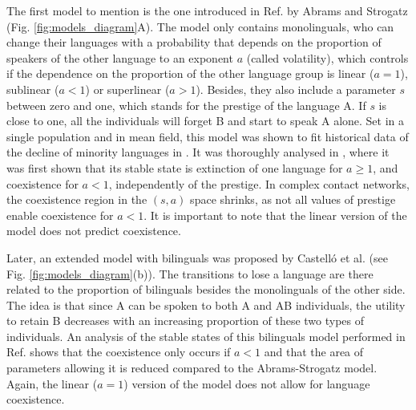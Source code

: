 \documentclass[../thesis.tex]{subfiles}
\begin{document}
The first model to mention is the one introduced in Ref.
\cite{AbramsModellingDynamics2003} by Abrams and Strogatz (Fig.
\ref{fig:models_diagram}A). The model only contains monolinguals, who can change their
languages with a probability that depends on the proportion of speakers of the other
language to an exponent $a$ (called volatility), which controls if the dependence on the
proportion of the other language group is linear ($a = 1$), sublinear ($a<1$) or
superlinear ($a>1$). Besides, they also include a parameter $s$ between zero and one,
which stands for the prestige of the language A. If $s$ is close to one, all the
individuals will forget B and start to speak A alone. Set in a single population and in
mean field, this model was shown to fit historical data of the decline of minority
languages in \cite{AbramsModellingDynamics2003}. It was thoroughly analysed in
\cite{VazquezAgentBased2010}, where it was first shown that its stable state is
extinction of one language for $a \ge 1$, and coexistence for $a < 1$, independently of
the prestige. In complex contact networks, the coexistence region in the $(s, a)$ space
shrinks, as not all values of prestige enable coexistence for $a < 1$. It is important
to note that the linear version of the model does not predict coexistence.    

Later, an extended model with bilinguals was proposed by Castell\'o et al.
\cite{CastelloOrderingDynamics2006} (see Fig. \ref{fig:models_diagram}(b)). The
transitions to lose a language are there related to the proportion of bilinguals besides
the monolinguals of the other side. The idea is that since A can be spoken to both A and
AB individuals, the utility to retain B decreases with an increasing proportion of these
two types of individuals. An analysis of the stable states of this bilinguals model
performed in Ref. \cite{VazquezAgentBased2010} shows that the coexistence only occurs if
$a < 1$ and that the area of parameters allowing it is reduced compared to the
Abrams-Strogatz model. Again, the linear ($a = 1$) version of the model does not allow
for language coexistence.
\end{document}
